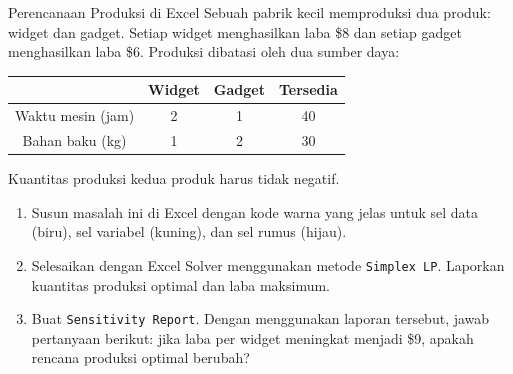 \begin{ex}{Perencanaan Produksi di Excel}{}
\label{ex:excel-production-planning}
 Sebuah pabrik kecil memproduksi dua produk: widget dan gadget. Setiap widget menghasilkan laba \$8 dan setiap gadget menghasilkan laba \$6. Produksi dibatasi oleh dua sumber daya:

\begin{center}
\begin{tabular}{c|c|c|c}
 & \textbf{Widget} & \textbf{Gadget} & \textbf{Tersedia} \\
\hline
Waktu mesin (jam) & 2 & 1 & 40 \\
Bahan baku (kg) & 1 & 2 & 30 \\
\end{tabular}
\par{}\label{tab:software-excel-tab02}%

\end{center}

Kuantitas produksi kedua produk harus tidak negatif.

\begin{enumerate}
\item Susun masalah ini di Excel dengan kode warna yang jelas untuk sel data (biru), sel variabel (kuning), dan sel rumus (hijau).
\item Selesaikan dengan Excel Solver menggunakan metode \texttt{Simplex LP}. Laporkan kuantitas produksi optimal dan laba maksimum.
\item Buat \texttt{Sensitivity Report}. Dengan menggunakan laporan tersebut, jawab pertanyaan berikut: jika laba per widget meningkat menjadi \$9, apakah rencana produksi optimal berubah?
\end{enumerate}
\exrefs{\S\ref{sec:excel-solver}}
\end{ex}

